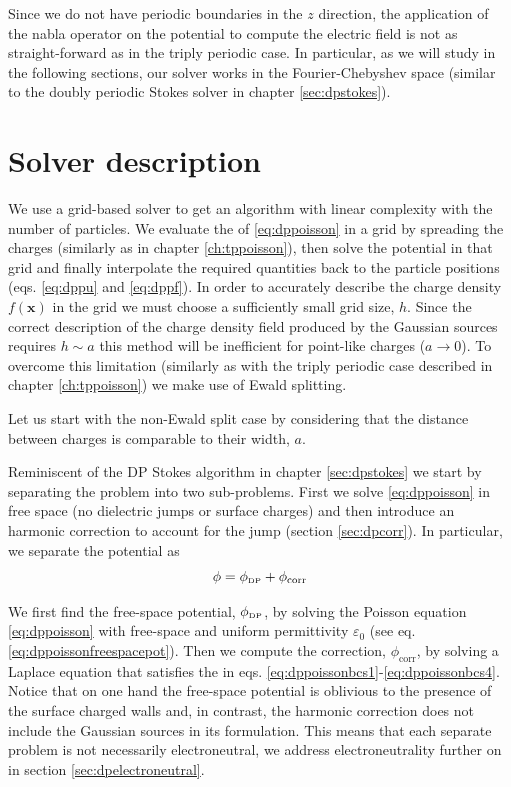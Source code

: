 \documentclass[ twoside,openright,titlepage,numbers=noenddot,%
headinclude,footinclude,cleardoublepage=empty,abstract=on,
BCOR=5mm,paper=a4,fontsize=11pt, dvipsnames
]{scrreprt}
\renewcommand{\vec}[1]{\bm{#1}}
\newcommand{\corr}{\text{corr}}
\newcommand{\dpr}{\text{\tiny DP}}
\begin{document}
Since we do not have periodic boundaries in the $z$ direction, the application of the nabla operator on the potential to compute the electric field is not as straight-forward as in the triply periodic case. In particular, as we will study in the following sections, our solver works in the Fourier-Chebyshev space (similar to the doubly periodic Stokes solver in chapter \ref{sec:dpstokes}).

\section{Solver description}
We use a grid-based solver to get an algorithm with linear complexity with the number of particles. We evaluate the \rhs of \eqref{eq:dppoisson} in a grid by spreading the charges (similarly as in chapter \ref{ch:tppoisson}), then solve the potential in that grid and finally interpolate the required quantities back to the particle positions (eqs. \eqref{eq:dppu} and \eqref{eq:dppf}).
In order to accurately describe the charge density $f(\vec{x})$ in the grid we must choose a sufficiently small grid size, $h$. Since the correct description of the charge density field produced by the Gaussian sources requires $h \sim a$ this method will be inefficient for point-like charges ($a\rightarrow 0$). To overcome this limitation (similarly as with the triply periodic case described in chapter \ref{ch:tppoisson}) we make use of Ewald splitting.

Let us start with the non-Ewald split case by considering that the distance between charges is comparable to their width, $a$.

Reminiscent of the \gls{DP} Stokes algorithm in chapter \ref{sec:dpstokes} we start by separating the problem into two sub-problems. First we solve \eqref{eq:dppoisson} in free space (no dielectric jumps or surface charges) and then introduce an harmonic correction to account for the jump \bcs (section \ref{sec:dpcorr}). In particular, we separate the potential as
\begin{equation}
  \label{eq:dppoissonpotsep}
  \phi = \phi_{\dpr} + \phi_{\corr}
\end{equation}


We first find the free-space potential, $\phi_{\dpr}$, by solving the Poisson equation \eqref{eq:dppoisson} with free-space \bcs and uniform permittivity $\varepsilon_0$ (see eq. \eqref{eq:dppoissonfreespacepot}). Then we compute the correction, $\phi_{\corr}$, by solving a Laplace equation that satisfies the \bcs in eqs. \eqref{eq:dppoissonbcs1}-\eqref{eq:dppoissonbcs4}.
Notice that on one hand the free-space potential is oblivious to the presence of the surface charged walls and, in contrast, the harmonic correction does not include the Gaussian sources in its formulation. This means that each separate problem is not necessarily electroneutral, we address electroneutrality further on in section \ref{sec:dpelectroneutral}.
\end{document}
